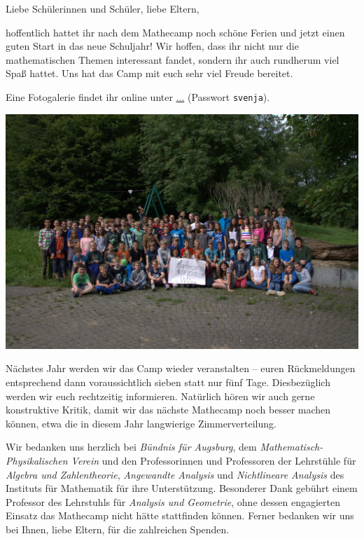 \documentclass[12pt]{zettel}
\begin{document}
\renewcommand{\betreff}{Mathecamp -- schön war's!}

\makeletterhead{}
\vspace{-2em}

Liebe Schülerinnen und Schüler, liebe Eltern,

hoffentlich hattet ihr nach dem Mathecamp noch schöne Ferien und jetzt einen
guten Start in das neue Schuljahr! Wir hoffen, dass ihr nicht nur die
mathematischen Themen interessant fandet, sondern ihr auch rundherum viel
Spaß hattet. Uns hat das Camp mit euch sehr viel Freude bereitet.

Eine Fotogalerie findet ihr online unter \url{...} (Passwort \texttt{svenja}).

\begin{center}
  \includegraphics[scale=0.25]{gruppenfoto}
\end{center}

Nächstes Jahr werden wir das Camp wieder veranstalten -- euren Rückmeldungen
entsprechend dann voraussichtlich sieben statt nur fünf Tage. Diesbezüglich
werden wir euch rechtzeitig informieren. Natürlich hören wir auch gerne
konstruktive Kritik, damit wir das nächste Mathecamp noch besser
machen können, etwa die in diesem Jahr langwierige Zimmerverteilung.

Wir bedanken uns herzlich bei \emph{Bündnis für Augsburg}, dem
\emph{Mathematisch-Physikalischen Verein} und den Professorinnen und
Professoren der Lehrstühle für \emph{Algebra und Zahlentheorie},
\emph{Angewandte Analysis} und \emph{Nichtlineare Analysis} des Instituts für
Mathematik für ihre Unterstützung.
Besonderer Dank gebührt einem Professor des
Lehrstuhls für \emph{Analysis und Geometrie}, ohne dessen engagierten Einsatz
das Mathecamp nicht hätte stattfinden können.
Ferner bedanken wir uns bei Ihnen, liebe Eltern, für die zahlreichen
Spenden.
\end{document}
